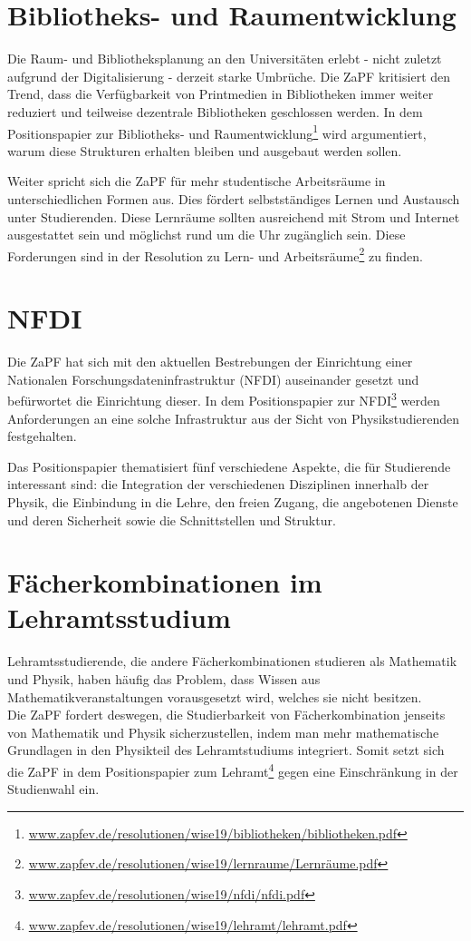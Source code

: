 \section*{Bibliotheks- und Raumentwicklung}
Die Raum- und Bibliotheksplanung an den Universitäten erlebt - nicht zuletzt aufgrund der Digitalisierung - derzeit starke Umbrüche. Die ZaPF kritisiert den Trend, dass die Verfügbarkeit von Printmedien in Bibliotheken immer weiter reduziert und teilweise dezentrale Bibliotheken geschlossen werden. In dem Positionspapier zur Bibliotheks- und Raumentwicklung\footnote{\url{www.zapfev.de/resolutionen/wise19/bibliotheken/bibliotheken.pdf}} wird argumentiert, warum diese Strukturen erhalten bleiben und ausgebaut werden sollen.

Weiter spricht sich die ZaPF für mehr studentische Arbeitsräume in unterschiedlichen Formen aus. Dies fördert selbstständiges Lernen und Austausch unter Studierenden. Diese Lernräume sollten ausreichend mit Strom und Internet ausgestattet sein und möglichst rund um die Uhr zugänglich sein. Diese Forderungen sind in der Resolution zu Lern- und Arbeitsräume\footnote{\url{www.zapfev.de/resolutionen/wise19/lernraume/Lernräume.pdf}} zu finden.

\section*{NFDI}
Die ZaPF hat sich mit den aktuellen Bestrebungen der Einrichtung einer Nationalen Forschungsdateninfrastruktur (NFDI) auseinander gesetzt und befürwortet die Einrichtung dieser. In dem Positionspapier zur NFDI\footnote{\url{www.zapfev.de/resolutionen/wise19/nfdi/nfdi.pdf}} werden Anforderungen an eine solche Infrastruktur aus der Sicht von Physikstudierenden festgehalten.

Das Positionspapier thematisiert fünf verschiedene Aspekte, die für Studierende interessant sind: die Integration der verschiedenen Disziplinen innerhalb der Physik, die Einbindung in die Lehre, den freien Zugang, die angebotenen Dienste und deren Sicherheit sowie die Schnittstellen und Struktur.

\newpage
\section*{Fächerkombinationen im Lehramtsstudium}
Lehramtsstudierende, die andere Fächerkombinationen studieren als Mathematik und Physik, haben häufig das Problem, dass Wissen aus Mathematikveranstaltungen vorausgesetzt wird, welches sie nicht besitzen.\\
Die ZaPF fordert deswegen, die Studierbarkeit von Fächerkombination jenseits von Mathematik und Physik sicherzustellen, indem man mehr mathematische Grundlagen in den Physikteil des Lehramtstudiums integriert. Somit setzt sich die ZaPF in dem Positionspapier zum Lehramt\footnote{\url{www.zapfev.de/resolutionen/wise19/lehramt/lehramt.pdf}} gegen eine Einschränkung in der Studienwahl ein.

